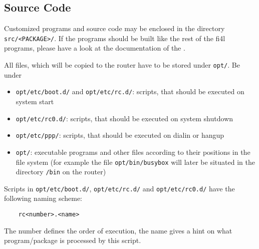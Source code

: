 \subsection{Source Code}

    Customized programs and source code may be enclosed in the directory
    \texttt{src/<PACKAGE>/}. If the programs should be built like the rest
    of the fi4l programs, please have a look at the documentation of the
     .


    All files, which will be copied to the router have to be stored under
    \texttt{opt/}. Be under
    \begin{itemize}
    \item \texttt{opt/etc/boot.d/} and \texttt{opt/etc/rc.d/}: scripts, that should be
      executed on system start
    \item \texttt{opt/etc/rc0.d/}: scripts, that should be
      executed on system shutdown
    \item \texttt{opt/etc/ppp/}: scripts, that should be
      executed on dialin or hangup
    \item \texttt{opt/}: executable programs and other files
       according to their positions in the file system (for example the file
      \texttt{opt/bin/busybox} will later be situated in the directory \texttt{/bin}
      on the router)
    \end{itemize}

    Scripts in \texttt{opt/etc/boot.d/}, \texttt{opt/etc/rc.d/} and
    \texttt{opt/etc/rc0.d/}
    have the following naming scheme:

    \begin{example}
    \begin{verbatim}
    rc<number>.<name>
    \end{verbatim}
    \end{example}

    The number defines the order of execution, the name gives a hint on
    what program/package is processed by this script.
